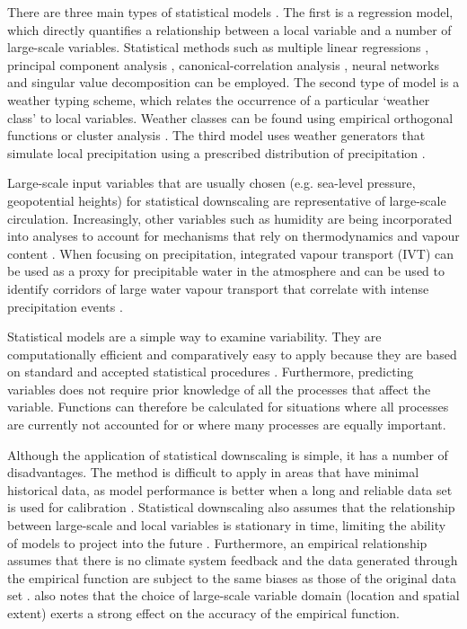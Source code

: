 \documentclass{sfuthesis}
\begin{document}
\begin{appendices}
There are three main types of statistical models \citep{Fowler2007}. The first is a regression model, which directly quantifies a relationship between a local variable and a number of large-scale variables. Statistical methods such as multiple linear regressions \citep{Hanssen-Bauer1998}, principal component analysis \citep{Kidson1998}, canonical-correlation analysis \citep{Busuioc2001}, neural networks \citep{Zorita1999} and singular value decomposition \citep{Widmann2003} can be employed.  The second type of model is a weather typing scheme, which relates the occurrence of a particular `weather class' to local variables. Weather classes can be found using empirical orthogonal functions or cluster analysis \citep{Fowler2007}. The third model uses weather generators that simulate local precipitation using a prescribed distribution of precipitation \citep{Fowler2007}. 

Large-scale input variables that are usually chosen (e.g. sea-level pressure, geopotential heights) for statistical downscaling are representative of large-scale circulation. Increasingly, other variables such as humidity are being incorporated into analyses to account for mechanisms that rely on thermodynamics and vapour content \citep{Fowler2007}. When focusing on precipitation, integrated vapour transport (IVT) can be used as a proxy for precipitable water in the atmosphere and can be used to identify corridors of large water vapour transport that correlate with intense precipitation events \citep{Neiman2008}. 

Statistical models are a simple way to examine variability. They are computationally efficient and comparatively easy to apply because they are based on standard and accepted statistical procedures \citep{Fowler2007}. Furthermore, predicting variables does not require prior knowledge of all the processes that affect the variable. Functions can therefore be calculated for situations where all processes are currently not accounted for or where many processes are equally important. 

Although the application of statistical downscaling is simple, it has a number of disadvantages. The method is difficult to apply in areas that have minimal historical data, as model performance is better when a long and reliable data set is used for calibration \citep{Fowler2007}. Statistical downscaling also assumes that the relationship between large-scale and local variables is stationary in time, limiting the ability of models to project into the future \citep{Fowler2007}. Furthermore, an empirical relationship assumes that there is no climate system feedback and the data generated through the empirical function are subject to the same biases as those of the original data set \citep{Fowler2007}. \cite{Wilby2000} also notes that the choice of large-scale variable domain (location and spatial extent) exerts a strong effect on the accuracy of the empirical function.


\end{appendices}
\end{document}
